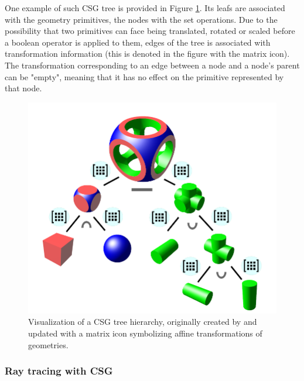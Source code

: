 One example of such CSG tree is provided in Figure \ref{fig:csg_tree}. Its leafs are associated with the geometry primitives, the nodes with the set operations. Due to the possibility that two primitives can face being translated, rotated or scaled before a boolean operator is applied to them, edges of the tree is associated with transformation information (this is denoted in the figure with the matrix icon). The transformation corresponding to an edge between a node and a node's parent can be "empty", meaning that it has no effect on the primitive represented by that node.  

\begin{figure}
	\centering
	\includegraphics[width=.9\linewidth]{img/1 fundamentals/csg_tree.png}
	\caption{Visualization of a CSG tree hierarchy, originally created by \cite{csgtree} and updated
	with a matrix icon symbolizing affine transformations of geometries.}
	\label{fig:csg_tree}
\end{figure}

\subsubsection{Ray tracing with CSG}

